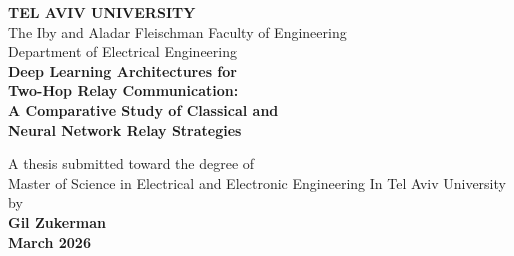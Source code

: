 \documentclass[12pt,a4paper,oneside]{book}
\theoremstyle{definition}
\begin{document}
\begin{titlepage}
\begin{center}
\vspace*{0.5cm}
{\LARGE\textbf{TEL AVIV UNIVERSITY}}\\[6pt]
{\large The Iby and Aladar Fleischman Faculty of Engineering}\\[4pt]
{\large Department of Electrical Engineering}\\[2cm]

{\LARGE\bfseries
Deep Learning Architectures for\\
Two-Hop Relay Communication:\\
A Comparative Study of Classical and\\
Neural Network Relay Strategies\\[2cm]
}

{\large A thesis submitted toward the degree of}\\
{\large Master of Science in Electrical and Electronic Engineering \newline In Tel Aviv University}\\[1.5cm]

{\large by}\\[6pt]
{\Large\bfseries Gil Zukerman}\\[1.5cm]
\vfill
{\large\textbf{March 2026}}\\[1.5cm]

\end{center}
\end{titlepage}
\end{document}
